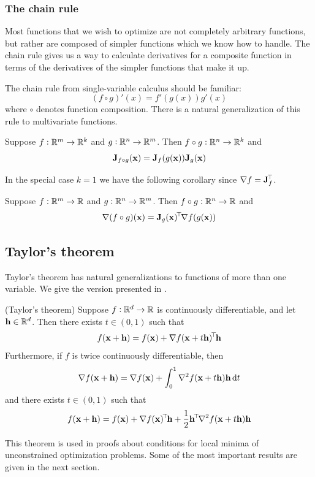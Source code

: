 \subsubsection{The chain rule}
Most functions that we wish to optimize are not completely arbitrary functions, but rather are composed of simpler functions which we know how to handle.
The chain rule gives us a way to calculate derivatives for a composite function in terms of the derivatives of the simpler functions that make it up.

The chain rule from single-variable calculus should be familiar:
\[(f \circ g)'(x) = f'(g(x))g'(x)\]
where $\circ$ denotes function composition.
There is a natural generalization of this rule to multivariate functions.
\begin{proposition}
Suppose $f : \mathbb{R}^m \to \mathbb{R}^k$ and $g : \mathbb{R}^n \to \mathbb{R}^m$. Then $f \circ g : \mathbb{R}^n \to \mathbb{R}^k$ and
\[\mathbf{J}_{f \circ g}(\mathbf{x}) = \mathbf{J}_f(g(\mathbf{x}))\mathbf{J}_g(\mathbf{x})\]
\end{proposition}
In the special case $k = 1$ we have the following corollary since $\nabla f = \mathbf{J}_f^{\!\top\!}$.
\begin{corollary}
Suppose $f : \mathbb{R}^m \to \mathbb{R}$ and $g : \mathbb{R}^n \to \mathbb{R}^m$. Then $f \circ g : \mathbb{R}^n \to \mathbb{R}$ and
\[\nabla (f \circ g)(\mathbf{x}) = \mathbf{J}_g(\mathbf{x})^{\!\top\!} \nabla f(g(\mathbf{x}))\]
\end{corollary}

\subsection{Taylor's theorem}
Taylor's theorem has natural generalizations to functions of more than one variable.
We give the version presented in \cite{numopt}.
\begin{theorem}
(Taylor's theorem)
Suppose $f : \mathbb{R}^d \to \mathbb{R}$ is continuously differentiable, and let $\mathbf{h} \in \mathbb{R}^d$.
Then there exists $t \in (0,1)$ such that
\[f(\mathbf{x} + \mathbf{h}) = f(\mathbf{x}) + \nabla f(\mathbf{x} + t\mathbf{h})^{\!\top\!}\mathbf{h}\]
Furthermore, if $f$ is twice continuously differentiable, then
\[\nabla f(\mathbf{x} + \mathbf{h}) = \nabla f(\mathbf{x}) + \int_0^1 \nabla^2 f(\mathbf{x} + t\mathbf{h})\mathbf{h} \dd{t}\]
and there exists $t \in (0,1)$ such that
\[f(\mathbf{x} + \mathbf{h}) = f(\mathbf{x}) + \nabla f(\mathbf{x})^{\!\top\!}\mathbf{h} + \frac{1}{2}\mathbf{h}^{\!\top\!}\nabla^2f(\mathbf{x}+t\mathbf{h})\mathbf{h}\]
\end{theorem}
This theorem is used in proofs about conditions for local minima of unconstrained optimization problems.
Some of the most important results are given in the next section.

